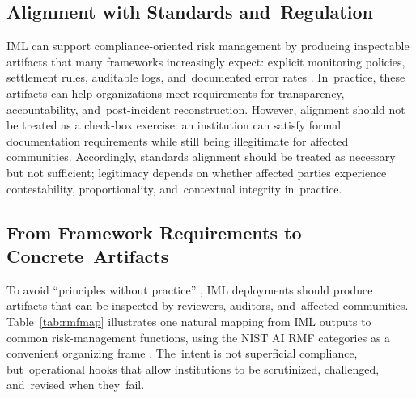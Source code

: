 \documentclass[mca,article,accept,pdftex,oneauthor]{Definitions/mdpi}
\begin{document}
\subsection{Alignment with Standards and~Regulation}

IML can support compliance-oriented risk management by producing inspectable artifacts that many frameworks increasingly expect: explicit monitoring policies, settlement rules, auditable logs, and~documented error rates \citep{NIST2023AIRMF,ISO23894,OECDAI2019,EU2024AIAct}. In~practice, these artifacts can help organizations meet requirements for transparency, accountability, and~post-incident reconstruction. However, alignment should not be treated as a check-box exercise: an institution can satisfy formal documentation requirements while still being illegitimate for affected communities. Accordingly, standards alignment should be treated as necessary but not sufficient; legitimacy depends on whether affected parties experience contestability, proportionality, and~contextual integrity in~practice.

\subsection{From Framework Requirements to Concrete~Artifacts}

To avoid ``principles without practice'' \citep{Mittelstadt2019Principles}, IML deployments should produce artifacts that can be inspected by reviewers, auditors, and~affected communities. Table~\ref{tab:rmfmap} illustrates one natural mapping from IML outputs to common risk-management functions, using the NIST AI RMF categories as a convenient organizing frame \citep{NIST2023AIRMF}. The~intent is not superficial compliance, but~operational hooks that allow institutions to be scrutinized, challenged, and~revised when they~fail.
\end{document}
